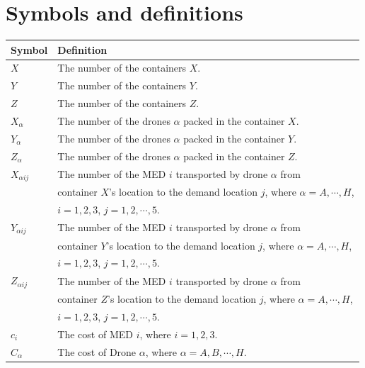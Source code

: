 \documentclass{mcmthesis}
\begin{document}
\section{Symbols and definitions}\label{section:Sym}
\renewcommand\arraystretch{1.5}
\begin{tabular}{ll}
	\hline
	Symbol&  Definition\\
	\hline
	$X$& The number of the containers $X$.\\
	
	$Y$& The number of the containers $Y$.\\
	
	$Z$& The number of the containers $Z$.\\
	
	$X_\alpha$& The number of the drones $\alpha$ packed in the container $X$.\\
	
	$Y_\alpha$& The number of the drones $\alpha$ packed in the container $Y$.\\
	
	$Z_\alpha$& The number of the drones $\alpha$ packed in the container $Z$.\\
	
	$X_{\alpha ij}$& The number of the MED $i$ transported by drone $\alpha$ from\\	 
	& container $X$'s location to the demand location $j$, where $\alpha=A,\cdots,H$,\\ 
	& $i=1,2,3$, $j=1,2,\cdots,5$.\\
	
	$Y_{\alpha ij}$& The number of the MED $i$ transported by drone $\alpha$ from \\
	&container $Y$'s location to the demand location $j$, where $\alpha=A,\cdots,H$,\\
	& $i=1,2,3$, $j=1,2,\cdots,5$.\\
	
	$Z_{\alpha ij}$& The number of the MED $i$ transported by drone $\alpha$ from \\
	&container $Z$'s location to the demand location $j$, where $\alpha=A,\cdots,H$,\\ 
	&$i=1,2,3$, $j=1,2,\cdots,5$.\\
	
	$c_i$& The cost of MED $i$, where $i=1,2,3$.\\
	
	$C_\alpha$& The cost of Drone $\alpha$, where $\alpha=A,B,\cdots,H$.\\
	

\end{tabular}
\end{document}
